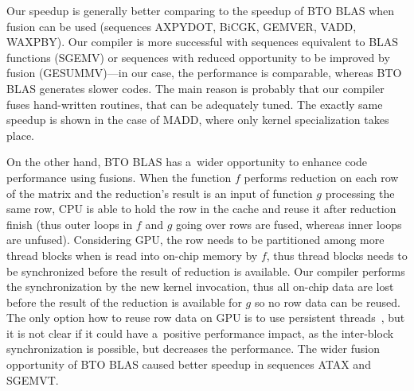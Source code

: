 \documentclass[final]{siamltex}
\begin{document}
{Our speedup is generally better comparing to the speedup of BTO BLAS when fusion can be used (sequences AXPYDOT, BiCGK, GEMVER, VADD, WAXPBY). Our compiler is more successful with sequences equivalent to BLAS functions (SGEMV) or sequences with reduced opportunity to be improved by fusion (GESUMMV)---in our case, the performance is comparable, whereas BTO BLAS generates slower codes. The main reason is probably that our compiler fuses hand-written routines, that can be adequately tuned. The exactly same speedup is shown in the case of MADD, where only kernel specialization takes place.

On the other hand, BTO BLAS has a~wider opportunity to enhance code performance using fusions. When the function $f$ performs reduction on each row of the matrix and the reduction's result is an input of function $g$ processing the same row, CPU is able to hold the row in the cache and reuse it after reduction finish (thus outer loops in $f$ and $g$ going over rows are fused, whereas inner loops are unfused). Considering GPU, the row needs to be partitioned among more thread blocks when is read into on-chip memory by $f$, thus thread blocks needs to be synchronized before the result of reduction is available. Our compiler performs the synchronization by the new kernel invocation, thus all on-chip data are lost before the result of the reduction is available for $g$ so no row data can be reused. The only option how to reuse row data on GPU is to use persistent threads~\cite{gupta2012study}, but it is not clear if it could have a~positive performance impact, as the inter-block synchronization is possible, but decreases the performance. The wider fusion opportunity of BTO BLAS caused better speedup in sequences ATAX and SGEMVT.

}
\end{document}

